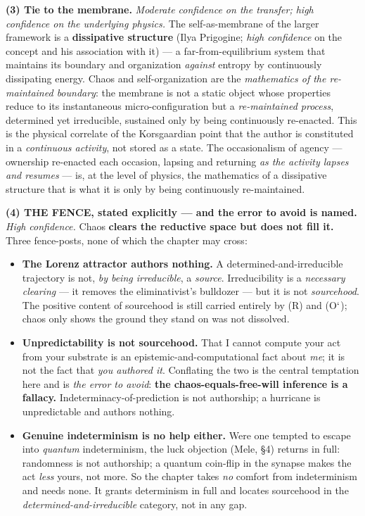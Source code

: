\documentclass[11pt]{article}
\begin{document}
\textbf{(3) Tie to the membrane.} \emph{Moderate confidence on the transfer; high confidence on the underlying physics.} The self-as-membrane of the larger framework is a \textbf{dissipative structure} (Ilya Prigogine; \emph{high confidence} on the concept and his association with it) — a far-from-equilibrium system that maintains its boundary and organization \emph{against} entropy by continuously dissipating energy. Chaos and self-organization are the \emph{mathematics of the re-maintained boundary}: the membrane is not a static object whose properties reduce to its instantaneous micro-configuration but a \emph{re-maintained process}, determined yet irreducible, sustained only by being continuously re-enacted. This is the physical correlate of the Korsgaardian point that the author is constituted in a \emph{continuous activity}, not stored as a state. The occasionalism of agency — ownership re-enacted each occasion, lapsing and returning \emph{as the activity lapses and resumes} — is, at the level of physics, the mathematics of a dissipative structure that is what it is only by being continuously re-maintained.

\textbf{(4) THE FENCE, stated explicitly — and the error to avoid is named.} \emph{High confidence.} Chaos \textbf{clears the reductive space but does not fill it.} Three fence-posts, none of which the chapter may cross:

\begin{itemize}
\item \textbf{The Lorenz attractor authors nothing.} A determined-and-irreducible trajectory is not, \emph{by being irreducible}, a \emph{source}. Irreducibility is a \emph{necessary clearing} — it removes the eliminativist's bulldozer — but it is not \emph{sourcehood}. The positive content of sourcehood is still carried entirely by (R) and (O\ensuremath{`}); chaos only shows the ground they stand on was not dissolved.
\item \textbf{Unpredictability is not sourcehood.} That I cannot compute your act from your substrate is an epistemic-and-computational fact about \emph{me}; it is not the fact that \emph{you authored it}. Conflating the two is the central temptation here and is \emph{the error to avoid}: \textbf{the chaos-equals-free-will inference is a fallacy.} Indeterminacy-of-prediction is not authorship; a hurricane is unpredictable and authors nothing.
\item \textbf{Genuine indeterminism is no help either.} Were one tempted to escape into \emph{quantum} indeterminism, the luck objection (Mele, §4) returns in full: randomness is not authorship; a quantum coin-flip in the synapse makes the act \emph{less} yours, not more. So the chapter takes \emph{no} comfort from indeterminism and needs none. It grants determinism in full and locates sourcehood in the \emph{determined-and-irreducible} category, not in any gap.
\end{itemize}
\end{document}
